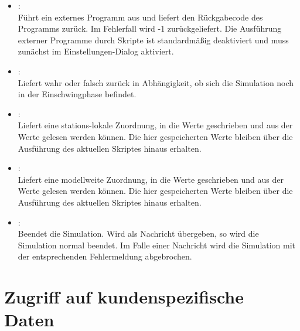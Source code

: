 \begin{itemize}
\item
{}:\\
Führt ein externes Programm aus und liefert den Rückgabecode des Programms zurück.
Im Fehlerfall wird -1 zurückgeliefert.
Die Ausführung externer Programme durch Skripte ist standardmäßig deaktiviert
und muss zunächst im Einstellungen-Dialog aktiviert.

\item
{}:\\
Liefert wahr oder falsch zurück in Abhängigkeit, ob sich die Simulation noch in der Einschwingphase befindet.

\item
{}:\\
Liefert eine stations-lokale Zuordnung, in die Werte geschrieben und aus der Werte gelesen werden können.
Die hier gespeicherten Werte bleiben über die Ausführung des aktuellen Skriptes hinaus erhalten.

\item
{}:\\
Liefert eine modellweite Zuordnung, in die Werte geschrieben und aus der Werte gelesen werden können.
Die hier gespeicherten Werte bleiben über die Ausführung des aktuellen Skriptes hinaus erhalten.

\item
{}:\\
Beendet die Simulation. Wird als Nachricht  übergeben, so wird die Simulation normal
beendet. Im Falle einer Nachricht wird die Simulation mit der entsprechenden Fehlermeldung abgebrochen.

\end{itemize}

\section{Zugriff auf kundenspezifische Daten}

